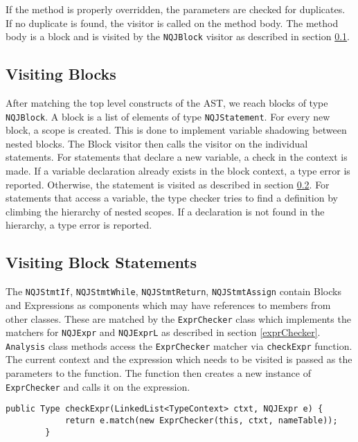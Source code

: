 \documentclass[]{tukportfolio}
\begin{document}
If the method is properly overridden, the parameters are checked for duplicates. If no duplicate is found, the visitor is called on the method body. The method body is a block and is visited by the \lstinline|NQJBlock| visitor as described in section \ref{visitBlock}.

\subsection{Visiting Blocks} \label{visitBlock}
After matching the top level constructs of the AST, we reach blocks of type \lstinline|NQJBlock|. A block is a list of elements of type \lstinline|NQJStatement|. For every new block, a scope is created. This is done to implement variable shadowing between nested blocks. The Block visitor then calls the visitor on the individual statements. For statements that declare a new variable, a check in the context is made. If a variable declaration already exists in the block context, a type error is reported. Otherwise, the statement is visited as described in section \ref{statementVisiting}. For statements that access a variable, the type checker tries to find a definition by climbing the hierarchy of nested scopes. If a declaration is not found in the hierarchy, a type error is reported.

\subsection{Visiting Block Statements}\label{statementVisiting}
The \lstinline|NQJStmtIf|, \lstinline|NQJStmtWhile|, \lstinline|NQJStmtReturn|, \lstinline|NQJStmtAssign| contain Blocks and Expressions as components which may have references to members from other classes. These are matched by the \lstinline|ExprChecker| class which implements the matchers for \lstinline|NQJExpr| and \lstinline|NQJExprL|  as described in section \ref{exprChecker}. \lstinline|Analysis| class methods access the \lstinline|ExprChecker|  matcher via \lstinline|checkExpr| function. The current context and the expression which needs to be visited is passed as the parameters to the function. The function then creates a new instance of \lstinline|ExprChecker| and calls it on the expression.

\begin{lstlisting}[caption={checkExpr for matching components of statements},captionpos=b,label={fun:checkInheritanceCycle}]
		public Type checkExpr(LinkedList<TypeContext> ctxt, NQJExpr e) {
			return e.match(new ExprChecker(this, ctxt, nameTable));
		}
\end{lstlisting}
\end{document}
